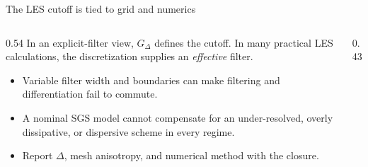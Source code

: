 \documentclass[aspectratio=169,11pt]{beamer}
\begin{document}
\begin{frame}{The LES cutoff is tied to grid and numerics}
\begin{columns}[T,onlytextwidth]
\begin{column}{0.54\textwidth}
In an explicit-filter view, $G_\Delta$ defines the cutoff. In many practical LES calculations, the discretization supplies an \emph{effective} filter.

\begin{itemize}\itemsep4pt
  \item Variable filter width and boundaries can make filtering and differentiation fail to commute.
  \item A nominal SGS model cannot compensate for an under-resolved, overly dissipative, or dispersive scheme in every regime.
  \item Report $\Delta$, mesh anisotropy, and numerical method with the closure.
\end{itemize}
\end{column}
\begin{column}{0.43\textwidth}
\centering
{}
\end{column}
\end{columns}
\end{frame}
\end{document}
